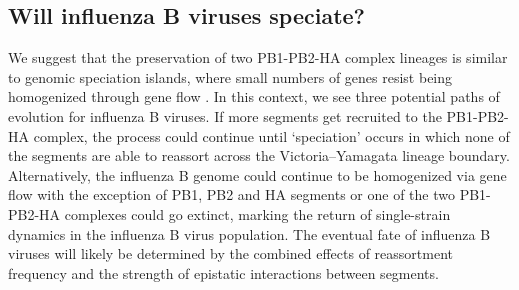 \documentclass[11pt,oneside,letterpaper]{article}
\newcommand{\dtmrca}{\Delta_\mathrm{TMRCA}}
\begin{document}
\subsection*{Will influenza B viruses speciate?}
We suggest that the preservation of two PB1-PB2-HA complex lineages is similar to genomic speciation islands, where small numbers of genes resist being homogenized through gene flow \citep{turner2005}.
In this context, we see three potential paths of evolution for influenza B viruses.
If more segments get recruited to the PB1-PB2-HA complex, the process could continue until `speciation' occurs in which none of the segments are able to reassort across the Victoria--Yamagata lineage boundary.
Alternatively, the influenza B genome could continue to be homogenized via gene flow with the exception of PB1, PB2 and HA segments or one of the two PB1-PB2-HA complexes could go extinct, marking the return of single-strain dynamics in the influenza B virus population.
The eventual fate of influenza B viruses will likely be determined by the combined effects of reassortment frequency and the strength of epistatic interactions between segments.

\end{document}
